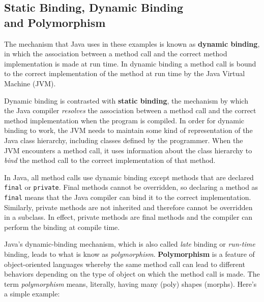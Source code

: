 

\subsection{Static Binding, Dynamic Binding \\and Polymorphism}

The mechanism that Java uses in these examples is known as {\bf
dynamic binding}, in which the association between a method call and
the correct method implementation is made at run time. In dynamic
binding a method call is bound to the correct implementation of the
method at run time by the Java Virtual Machine (JVM).

Dynamic binding is contrasted with {\bf static binding}, the mechanism
by which the Java compiler {\em resolves} the association between a
method call and the correct method implementation when the program is
compiled. In order for dynamic binding to work, the JVM needs to
maintain some kind of representation of the Java class hierarchy,
including classes defined by the programmer.  When the JVM encounters
a method call, it uses information about the class hierarchy to {\em
bind} the method call to the correct implementation of that method.

In Java, all method calls use dynamic binding except methods that are
declared {\tt final} or {\tt private}. Final methods cannot be
overridden, so declaring a method as {\tt final} means that the Java
compiler can bind it to the correct implementation.  Similarly,
private methods are not inherited and therefore cannot be overridden
in a subclass. In effect, private methods are final methods and the
compiler can perform the binding at compile time.

Java's dynamic-binding mechanism, which is also called {\em late}
binding or {\em run-time} binding, leads to what is know as {\em
polymorphism}.  {\bf Polymorphism} is a feature of object-oriented
languages whereby the same method call can lead to different behaviors
depending on the type of object on which the method call is made.  The
term {\em polymorphism} means, literally, having many (poly) shapes
(morphs).  Here's a simple example:

